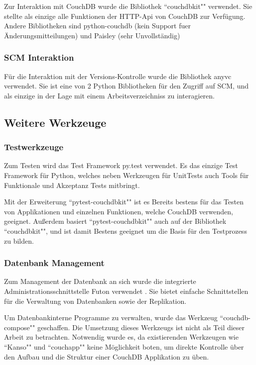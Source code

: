 Zur Interaktion mit CouchDB wurde die Bibliothek ``couchdbkit"" \cite{couchdbkit:website} verwendet.
Sie stellte als einzige alle Funktionen der HTTP-Api von CouchDB zur Verfügung.
Andere Bibliotheken sind python-couchdb (kein Support fuer Änderungsmitteilungen)
und Paisley (sehr Unvollständig)

\subsubsection{SCM Interaktion}

Für die Interaktion mit der Versions-Kontrolle wurde die Bibliothek anyvc \cite{anyvc:website} verwendet.
Sie ist eine von 2 Python Bibliotheken für den Zugriff auf SCM,
und als einzige in der Lage mit einem Arbeitsverzeichniss zu interagieren.

\subsection{Weitere Werkzeuge}

\subsubsection{Testwerkzeuge}

Zum Testen wird das Test Framework py.test \cite{pytest:website} verwendet.
Es das einzige Test Framework für Python,
welches neben Werkzeugen für UnitTests auch Tools für
Funktionale und Akzeptanz Tests mitbringt.

Mit der Erweiterung ``pytest-couchdbkit"" \cite{pytest:couchdbkit} ist es Bereits
bestens für das Testen von Applikationen und einzelnen Funktionen,
welche CouchDB verwenden, geeignet.
Außerdem basiert ``pytest-couchdbkit"" auch auf der Bibliothek ``couchdbkit"",
und ist damit Bestens geeignet um die Basis für den Testprozess zu bilden.

\subsubsection{Datenbank Management}

Zum Management der Datenbank an sich wurde die integrierte Administrationsschnittstelle Futon verwendet \cite{couchdb:futon}.
Sie bietet einfache Schnittstellen für die Verwaltung von Datenbanken sowie der Replikation.

Um Datenbankinterne Programme zu verwalten,
wurde das Werkzeug ``couchdb-compose"" \cite{couchdb:compose} geschaffen.
Die Umsetzung dieses Werkzeugs ist nicht als Teil dieser Arbeit zu betrachten.
Notwendig wurde es, da existierenden Werkzeugen wie ``Kanso"" und ``couchapp""
keine Möglichkeit boten, um direkte Kontrolle über den Aufbau und die Struktur 
einer CouchDB Applikation zu üben.

